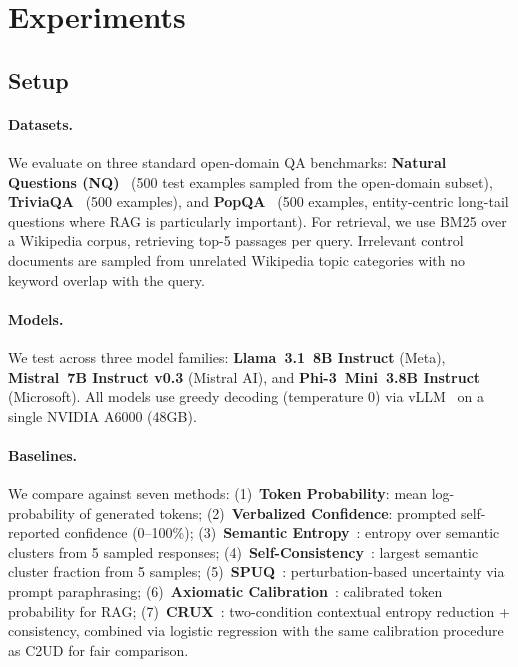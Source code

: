 \documentclass{article}
\newcommand{\ours}{\textsc{C2UD}}
\begin{document}
\section{Experiments}
\label{sec:experiments}

\subsection{Setup}

\paragraph{Datasets.}
We evaluate on three standard open-domain QA benchmarks: \textbf{Natural Questions (NQ)}~\citep{kwiatkowski2019natural} (500 test examples sampled from the open-domain subset), \textbf{TriviaQA}~\citep{joshi2017triviaqa} (500 examples), and \textbf{PopQA}~\citep{mallen2023when} (500 examples, entity-centric long-tail questions where RAG is particularly important).
For retrieval, we use BM25 over a Wikipedia corpus, retrieving top-5 passages per query.
Irrelevant control documents are sampled from unrelated Wikipedia topic categories with no keyword overlap with the query.

\paragraph{Models.}
We test across three model families: \textbf{Llama~3.1~8B Instruct} (Meta), \textbf{Mistral~7B Instruct v0.3} (Mistral AI), and \textbf{Phi-3~Mini~3.8B Instruct} (Microsoft).
All models use greedy decoding (temperature 0) via vLLM~\citep{izacard2022contriever} on a single NVIDIA A6000 (48GB).

\paragraph{Baselines.}
We compare against seven methods:
(1)~\textbf{Token Probability}: mean log-probability of generated tokens;
(2)~\textbf{Verbalized Confidence}: prompted self-reported confidence (0--100\%);
(3)~\textbf{Semantic Entropy}~\citep{farquhar2024detecting}: entropy over semantic clusters from 5 sampled responses;
(4)~\textbf{Self-Consistency}~\citep{wang2023selfconsistency}: largest semantic cluster fraction from 5 samples;
(5)~\textbf{SPUQ}~\citep{gao2024spuq}: perturbation-based uncertainty via prompt paraphrasing;
(6)~\textbf{Axiomatic Calibration}~\citep{soudani2025why}: calibrated token probability for RAG;
(7)~\textbf{CRUX}~\citep{yuan2026crux}: two-condition contextual entropy reduction + consistency, combined via logistic regression with the same calibration procedure as \ours{} for fair comparison.
\end{document}
